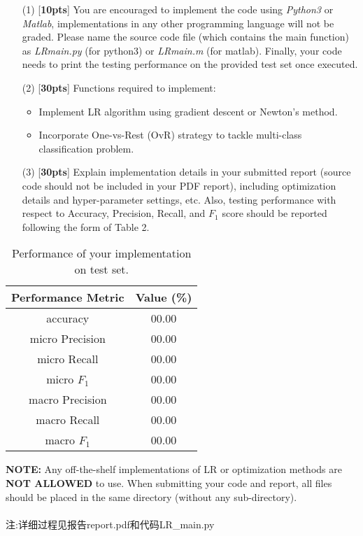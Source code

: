 \documentclass{article}
\begin{document}
\begin{enumerate}
    \item[(1)] [\textbf{10pts}] You are encouraged to implement the code using \emph{Python3} or \emph{Matlab}, implementations in any other programming language will not be graded. Please name the source code file (which contains the main function) as \emph{LR\underline{\hspace{0.5em}}main.py} (for python3) or \emph{LR\underline{\hspace{0.5em}}main.m} (for matlab). Finally, your code needs to print the testing performance on the provided test set once executed.

    \item[(2)] [\textbf{30pts}] Functions required to implement:
    \begin{itemize}
        \item Implement LR algorithm using gradient descent or Newton's method.
        \item Incorporate One-vs-Rest (OvR) strategy to tackle multi-class classification problem.
    \end{itemize}
    \item[(3)] [\textbf{30pts}] Explain implementation details in your submitted report (source code should not be included in your PDF report), including optimization details and hyper-parameter settings, etc. Also, testing performance with respect to Accuracy, Precision, Recall, and $F_1$ score should be reported following the form of Table 2.
\end{enumerate}

\begin{table}[h]
    \centering
     \caption{Performance of your implementation on test set.}
     \vspace{2mm}
    \label{tab:my_label}
    \begin{tabular}{|c|c|}
       \hline
       Performance Metric & Value (\%) \\
       \hline
       accuracy & 00.00 \\
       \hline
       micro Precision  & 00.00\\
       \hline
       micro Recall & 00.00\\
       \hline
       micro $F_1$ & 00.00\\
       \hline
       macro Precision  & 00.00\\
       \hline
       macro Recall & 00.00\\
       \hline
       macro $F_1$ & 00.00\\
       \hline
    \end{tabular}

\end{table}

\textbf{NOTE:} Any off-the-shelf implementations of LR or optimization methods are \textbf{NOT ALLOWED} to use. When submitting your code and report, all files should be placed in the same directory (without any sub-directory).
\\\\注:详细过程见报告report.pdf和代码LR\_main.py\\
\end{document}
